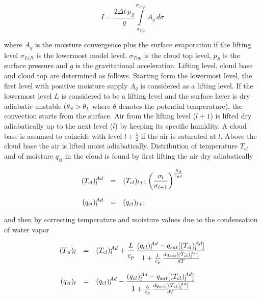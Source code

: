 \begin{equation}\label{cli}
I= \frac{2 \Delta t \, p_S}{g}
\int\limits_{\sigma_{Top}}^{\sigma_{Lift}} A_q \, d
\sigma
\end{equation}

where $A_q$ is the moisture convergence plus the
surface evaporation if the lifting level
$\sigma_{Lift}$ is the lowermost model level.
$\sigma_{Top}$ is the cloud top level, $p_S$ is
the surface pressure and $g$ is the gravitational
acceleration. Lifting level, cloud base and cloud
top are determined as follows. Starting form the
lowermost level, the first level with positive
moisture supply $A_q$ is considered  as a lifting level. If the lowermost level $L$ is considered
to be a lifting level and the surface layer is dry adiabatic unstable ($\theta_S > \theta_L$
where $\theta$ denotes the potential temperature), the convection starts from the surface.
Air from the lifting level ($l+1$) is lifted dry
adiabatically up to the next level ($l$) by keeping  its
specific humidity. A cloud base is
assumed to coincide with level $l+\frac{1}{2}$ if the
air is saturated at $l$. Above the cloud
base the air is lifted moist adiabatically. Distribution of
temperature $T_{cl}$ and of moisture
$q_{cl}$ in the cloud is found by first lifting the air
dry adiabatically

\begin{equation}\label{clad}
\begin{array}{rcl}
\displaystyle (T_{cl})_l^{Ad} & = & \displaystyle (T_{cl})_{l+1}
\left(\frac{\sigma_l}{\sigma_{l+1}}\right)^{\frac{R_
d}{c_{pd}}} \\
&&\\
\displaystyle (q_{cl})_l^{Ad}  & = & \displaystyle (q_{cl})_{l+1} 
\end{array}
\end{equation}

and then by correcting temperature and moisture values
due to the condensation of water vapor 

\begin{equation}\label{ccc1}
\begin{array}{rcl}
\displaystyle (T_{cl})_l & = & \displaystyle (T_{cl})_l^{Ad} +
\frac{L}{c_p} \, \frac{(q_{cl})_l^{Ad} - q_{sat}
[(T_{cl})_l^{Ad}]}{1+\frac{L}{c_p}\,
\frac{dq_{sat}[(T_{cl})_l^{Ad}]}{dT}} \\
&&\\
\displaystyle (q_{cl})_l & = & \displaystyle (q_{cl})_l^{Ad}
-\frac{(q_{cl})_l^{Ad} - q_{sat}[(T_
{cl})_l^{Ad}]}{1+\frac{L}{c_p}\,
\frac{dq_{sat}[(T_{cl})_l^{Ad}]}{dT}} 
\end{array}
\end{equation}

